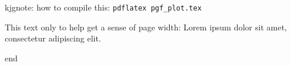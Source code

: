 \documentclass{article}
\begin{document}
kjgnote: how to compile this: \texttt{pdflatex pgf\_plot.tex}

%
%
%
%
%



This text only to help get a sense of page width: Lorem ipsum dolor sit amet, consectetur adipiscing elit. 

end
\end{document}
